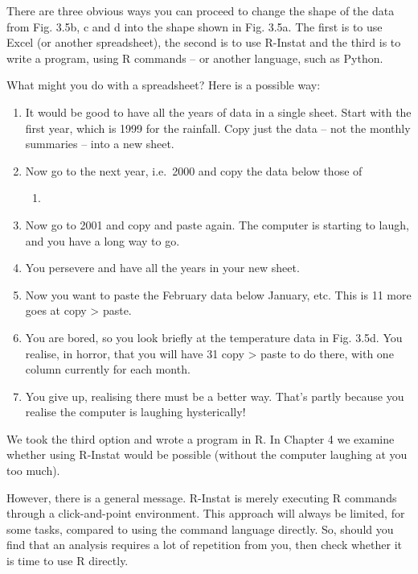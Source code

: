 \documentclass[
  letterpaper,
  DIV=11,
  numbers=noendperiod]{scrreprt}
\providecommand{\tightlist}{%
  \setlength{\itemsep}{0pt}\setlength{\parskip}{0pt}}\usepackage{longtable,booktabs,array}
\begin{document}
There are three obvious ways you can proceed to change the shape of the
data from Fig. 3.5b, c and d into the shape shown in Fig. 3.5a. The
first is to use Excel (or another spreadsheet), the second is to use
R-Instat and the third is to write a program, using R commands -- or
another language, such as Python.

What might you do with a spreadsheet? Here is a possible way:

\begin{enumerate}
\def\labelenumi{\arabic{enumi})}
\item
  It would be good to have all the years of data in a single sheet.
  Start with the first year, which is 1999 for the rainfall. Copy just
  the data -- not the monthly summaries -- into a new sheet.
\item
  Now go to the next year, i.e.~2000 and copy the data below those of

  \begin{enumerate}
  \def\labelenumii{\arabic{enumii}.}
  \setcounter{enumii}{1998}
  \tightlist
  \item
  \end{enumerate}
\item
  Now go to 2001 and copy and paste again. The computer is starting to
  laugh, and you have a long way to go.
\item
  You persevere and have all the years in your new sheet.
\item
  Now you want to paste the February data below January, etc. This is 11
  more goes at copy \textgreater{} paste.
\item
  You are bored, so you look briefly at the temperature data in Fig.
  3.5d. You realise, in horror, that you will have 31 copy
  \textgreater{} paste to do there, with one column currently for each
  month.
\item
  You give up, realising there must be a better way. That's partly
  because you realise the computer is laughing hysterically!
\end{enumerate}

We took the third option and wrote a program in R. In Chapter 4 we
examine whether using R-Instat would be possible (without the computer
laughing at you too much).

However, there is a general message. R-Instat is merely executing R
commands through a click-and-point environment. This approach will
always be limited, for some tasks, compared to using the command
language directly. So, should you find that an analysis requires a lot
of repetition from you, then check whether it is time to use R directly.
\end{document}
